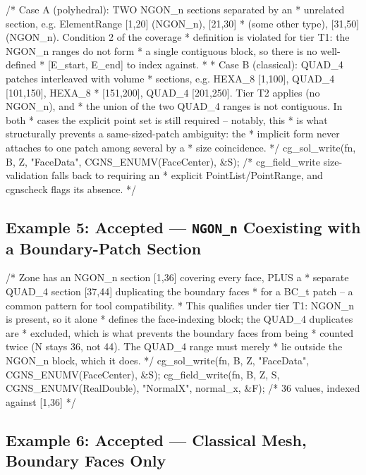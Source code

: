 \documentclass[11pt,letterpaper]{article}
\makeatletter
\let\cgns@orig@lstlisting\lstlisting
\let\cgns@endorig@lstlisting\endlstlisting
\renewenvironment{lstlisting}
  {\par\needspace{5\baselineskip}\nolinenumbers\cgns@orig@lstlisting}
  {\cgns@endorig@lstlisting\par\linenumbers}
\makeatother
\begin{document}
\begin{lstlisting}[language=C]
/* Case A (polyhedral): TWO NGON_n sections separated by an
 * unrelated section, e.g. ElementRange [1,20] (NGON_n), [21,30]
 * (some other type), [31,50] (NGON_n). Condition 2 of the coverage
 * definition is violated for tier T1: the NGON_n ranges do not form
 * a single contiguous block, so there is no well-defined
 * [E_start, E_end] to index against.
 *
 * Case B (classical): QUAD_4 patches interleaved with volume
 * sections, e.g. HEXA_8 [1,100], QUAD_4 [101,150], HEXA_8
 * [151,200], QUAD_4 [201,250]. Tier T2 applies (no NGON_n), and
 * the union of the two QUAD_4 ranges is not contiguous. In both
 * cases the explicit point set is still required -- notably, this
 * is what structurally prevents a same-sized-patch ambiguity: the
 * implicit form never attaches to one patch among several by a
 * size coincidence. */
cg_sol_write(fn, B, Z, "FaceData", CGNS_ENUMV(FaceCenter), &S);
/* cg_field_write size-validation falls back to requiring an
 * explicit PointList/PointRange, and cgnscheck flags its absence. */
\end{lstlisting}

\subsection{Example 5: Accepted --- \texttt{NGON\_n} Coexisting with a Boundary-Patch Section}
\label{sec:example5}

\begin{lstlisting}[language=C]
/* Zone has an NGON_n section [1,36] covering every face, PLUS a
 * separate QUAD_4 section [37,44] duplicating the boundary faces
 * for a BC_t patch -- a common pattern for tool compatibility.
 * This qualifies under tier T1: NGON_n is present, so it alone
 * defines the face-indexing block; the QUAD_4 duplicates are
 * excluded, which is what prevents the boundary faces from being
 * counted twice (N stays 36, not 44). The QUAD_4 range must merely
 * lie outside the NGON_n block, which it does. */
cg_sol_write(fn, B, Z, "FaceData", CGNS_ENUMV(FaceCenter), &S);
cg_field_write(fn, B, Z, S, CGNS_ENUMV(RealDouble), "NormalX",
               normal_x, &F);   /* 36 values, indexed against [1,36] */
\end{lstlisting}

\subsection{Example 6: Accepted --- Classical Mesh, Boundary Faces Only}
\label{sec:example6}
\end{document}
